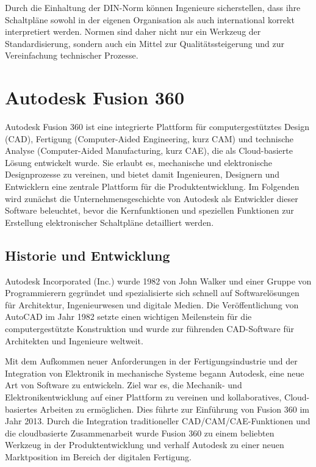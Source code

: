 Durch die Einhaltung der DIN-Norm können Ingenieure sicherstellen, dass ihre Schaltpläne sowohl in der eigenen Organisation als auch international korrekt interpretiert werden. Normen sind daher nicht nur ein Werkzeug der Standardisierung, sondern auch ein Mittel zur Qualitätssteigerung und zur Vereinfachung technischer Prozesse.

\section{Autodesk Fusion 360}
\label{Autodesk}
Autodesk Fusion 360 ist eine integrierte Plattform für computergestütztes Design (CAD), Fertigung (Computer-Aided Engineering, kurz CAM) und technische Analyse (Computer-Aided Manufacturing, kurz CAE), die als Cloud-basierte Lösung entwickelt wurde. Sie erlaubt es, mechanische und elektronische Designprozesse zu vereinen, und bietet damit Ingenieuren, Designern und Entwicklern eine zentrale Plattform für die Produktentwicklung. Im Folgenden wird zunächst die Unternehmensgeschichte von Autodesk als Entwickler dieser Software beleuchtet, bevor die Kernfunktionen und speziellen Funktionen zur Erstellung elektronischer Schaltpläne detailliert werden.


\subsection*{Historie und Entwicklung}
Autodesk Incorporated (Inc.) wurde 1982 von John Walker und einer Gruppe von Programmierern gegründet und spezialisierte sich schnell auf Softwarelösungen für Architektur, Ingenieurwesen und digitale Medien. \autocite{wikipedia_autodesk}
Die Veröffentlichung von AutoCAD im Jahr 1982 setzte einen wichtigen Meilenstein für die computergestützte Konstruktion und wurde zur führenden CAD-Software für Architekten und Ingenieure weltweit.\autocite{wikipedia_autocad_version_history}


Mit dem Aufkommen neuer Anforderungen in der Fertigungsindustrie und der Integration von Elektronik in mechanische Systeme begann Autodesk, eine neue Art von Software zu entwickeln. Ziel war es, die Mechanik- und Elektronikentwicklung auf einer Plattform zu vereinen und kollaboratives, Cloud-basiertes Arbeiten zu ermöglichen. Dies führte zur Einführung von Fusion 360 im Jahr 2013. \autocite{wikipedia_autodesk_deutsch}
Durch die Integration traditioneller CAD/CAM/CAE-Funktionen und die cloudbasierte Zusammenarbeit wurde Fusion 360 zu einem beliebten Werkzeug in der Produktentwicklung und verhalf Autodesk zu einer neuen Marktposition im Bereich der digitalen Fertigung.

